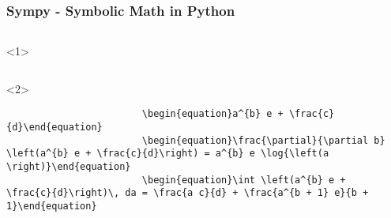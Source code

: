 \documentclass{beamer}
\begin{document}
        \begin{frame}[t,fragile]
            \frametitle{Sympy - Symbolic Math in Python}
            \begin{columns}[onlytextwidth]
                \begin{column}[T]{0.75\textwidth}
                    \begin{onlyenv}<1>
                        \inputminted{python}{\assetPath/Code/sympyexample.py}
                    \end{onlyenv}
                    \begin{onlyenv}<2>
                        \begin{verbatim}
                        \begin{equation}a^{b} e + \frac{c}{d}\end{equation}
                        \begin{equation}\frac{\partial}{\partial b} \left(a^{b} e + \frac{c}{d}\right) = a^{b} e \log{\left(a \right)}\end{equation}
                        \begin{equation}\int \left(a^{b} e + \frac{c}{d}\right)\, da = \frac{a c}{d} + \frac{a^{b + 1} e}{b + 1}\end{equation}
                        \end{verbatim}
                    \end{onlyenv}
                \end{column}\hfill
                \begin{column}[T]{0.2\textwidth}
                    
                \end{column}
            \end{columns}
        \end{frame}
\end{document}
